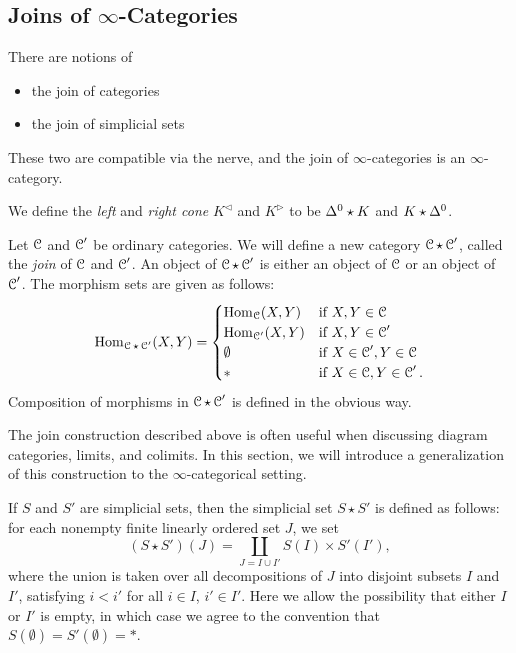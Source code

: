 \subsection{Joins of $\infty$-Categories}\label{join}
\begin{1.2.8 Joins of inf-cats}
\begin{shaded}
There are notions of
\begin{itemize}\squishlist
\setlength{\parindent}{.25in}
\item the join of categories
\item the join of simplicial sets
\end{itemize}
These two are compatible via the nerve, and the join of $\infty$-categories is an $\infty$-category.

We define the {\it left} and {\it right cone} $K^{\triangleleft}$ and $K^{\triangleright}$ to be $\Delta^0 \star K$ and $K\star\Delta^0$.
\end{shaded}
Let $\operatorname{\mathcal{C}}$ and $\operatorname{\mathcal{C}}'$ be ordinary categories. We will define a
new category $\operatorname{\mathcal{C}} \star \operatorname{\mathcal{C}}'$, called the {\it join} of $\operatorname{\mathcal{C}}$ and
$\operatorname{\mathcal{C}}'$. An object of $\operatorname{\mathcal{C}} \star \operatorname{\mathcal{C}}'$ is either an object of
$\operatorname{\mathcal{C}}$ or an object of $\operatorname{\mathcal{C}}'$. The morphism sets are given as follows:
 $$\operatorname{Hom}_{\operatorname{\mathcal{C}} \star \operatorname{\mathcal{C}}'}(X,Y) = \begin{cases} \operatorname{Hom}_{\operatorname{\mathcal{C}}}(X,Y) & \text{if } X,Y \in \operatorname{\mathcal{C}} \\
\operatorname{Hom}_{\operatorname{\mathcal{C}}'}(X,Y) & \text{if } X,Y \in \operatorname{\mathcal{C}}' \\
\emptyset & \text{if } X \in \operatorname{\mathcal{C}}', Y \in \operatorname{\mathcal{C}} \\
\ast & \text{if } X \in \operatorname{\mathcal{C}}, Y \in \operatorname{\mathcal{C}}'. \end{cases}$$
Composition of morphisms in $\operatorname{\mathcal{C}} \star \operatorname{\mathcal{C}}'$ is defined in the
obvious way. 

The join construction described above is often useful when discussing diagram categories, limits, and colimits. In this section, we will introduce a generalization of this construction to the $\infty$-categorical setting.

\begin{definition}
If $S$ and $S'$ are
simplicial sets, then the simplicial set $S \star S'$ is defined as
follows: for each nonempty finite linearly ordered set $J$, we set
$$(S \star S')(J) = \coprod_{J = I \cup I'} S(I) \times
S'(I'),$$ where the union is taken over all decompositions of $J$ into disjoint subsets $I$ and $I'$, satisfying $i < i'$ for all $i \in I$, $i' \in I'$. Here we allow the
possibility that either $I$ or $I'$ is empty, in which case we agree to
the convention that $S(\emptyset) = S'(\emptyset) = \ast$.
\end{definition}


\end{1.2.8 Joins of inf-cats}
